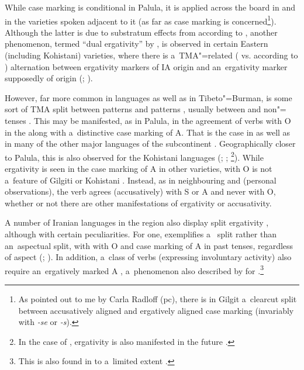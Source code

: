 While   case marking is conditional in Palula, it is applied across the board in \iliBurushaski and in the \iliShina varieties spoken adjacent to it (as far as case marking is concerned\footnote{As pointed out to me by Carla Radloff (pc), there is in Gilgit \iliShina a~clearcut split between accusatively aligned  and ergatively aligned case marking (invariably with \textit{-se} or \textit{-s}).}). Although the latter is due to substratum effects from \iliBurushaski according to \citet[248]{masica2001}, another phenomenon, termed ``dual ergativity'' by \citet[213]{hookkoul2004}, is observed in certain Eastern (including Kohistani) \iliShina varieties, where there is a~TMA"=related ( vs.  according to \citealt[51--53]{schmidtkohistani2008}) alternation between ergativity markers of IA origin and an~ergativity marker supposedly of \iliTibetan origin (\citealt[214]{hookkoul2004}; \citealt[211]{bailey1924}). 


\largerpage
However, far more common in \iliNIA languages as well as in Tibeto"=Burman, is some sort of TMA split between  patterns and  patterns \citep[248]{masica2001}, usually between  and non"= tenses \citep[342--343]{masica1991}. This may be manifested, as in Palula, in the agreement of  verbs with O in the  along with a~distinctive case marking of A. That is the case in \iliUrduHindi \citep[124]{schmidt1999} as well as in many of the other major \iliNIA languages of the subcontinent \citep[248]{masica2001}. Geographically closer to Palula, this is also observed for the Kohistani languages (\citealt[136]{baart1999a}; \citealt[34]{hallberghallberg1999}; \citealt[93--95]{lunsford2001}\footnote{In the case of \iliTorwali, ergativity is also manifested in the future .}). While ergativity is seen in the case marking of A in other \iliShina varieties,  with O is not a~feature of Gilgiti or Kohistani \iliShina. Instead, as in neighbouring \iliDameli and \iliGawarbati (personal observations), the verb agrees (accusatively) with S or A and never with O, whether or not there are other manifestations of ergativity or accusativity.



A number of Iranian languages in the region also display split ergativity \citep{payne1980}, although with certain peculiarities. For one, \iliPashto exemplifies a~ split rather than an~aspectual split, with  with O and  case marking of A in past tenses, regardless of aspect (\citealt[4--5]{tegey1977}; \citealt[71--72]{lorenz1979}). In addition, a~class of  verbs (expressing involuntary activity) also require an~ergatively marked A \citep[112]{babrakzai1999}, a~phenomenon also described by \citet[217]{hookkoul2004} for \iliIndoAryan \iliKashmiri.\footnote{This is also found in \iliUrdu to a~limited extent \citep[168]{schmidt1999}.} 



